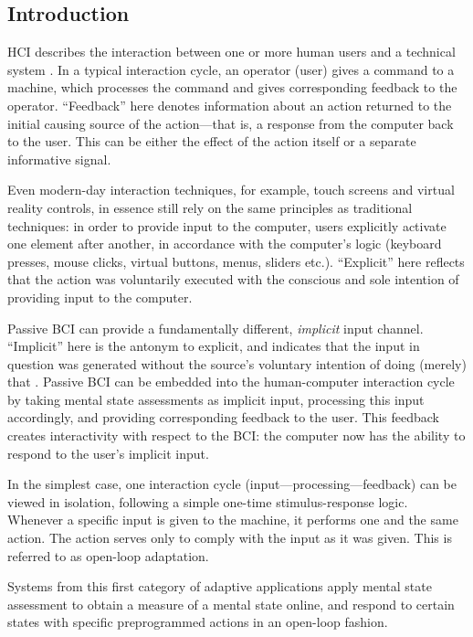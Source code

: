 \subsection{Introduction}

HCI describes the interaction between one or more human users and a technical system \cite{preece2015id}. In a typical interaction cycle, an operator (user) gives a command to a machine, which processes the command and gives corresponding feedback to the operator. ``Feedback'' here denotes information about an action returned to the initial causing source of the action---that is, a response from the computer back to the user. This can be either the effect of the action itself or a separate informative signal. 

Even modern-day interaction techniques, for example, touch screens and virtual reality controls, in essence still rely on the same principles as traditional techniques: in order to provide input to the computer, users explicitly activate one element after another, in accordance with the computer's logic (keyboard presses, mouse clicks, virtual buttons, menus, sliders etc.). ``Explicit'' here reflects that the action was voluntarily executed with the conscious and sole intention of providing input to the computer. 

Passive BCI can provide a fundamentally different, \emph{implicit} input channel. ``Implicit'' here is the antonym to explicit, and indicates that the input in question was generated without the source's voluntary intention of doing (merely) that \cite{schmidt2000,rotting2009implicit,zander2016nat}. Passive BCI can be embedded into the human-computer interaction cycle by taking mental state assessments as implicit input, processing this input accordingly, and providing corresponding feedback to the user. This feedback creates interactivity with respect to the BCI: the computer now has the ability to respond to the user's implicit input. 

In the simplest case, one interaction cycle (input---processing---feedback) can be viewed in isolation, following a simple one-time stimulus-response logic. Whenever a specific input is given to the machine, it performs one and the same action. The action serves only to comply with the input as it was given. This is referred to as open-loop adaptation.

Systems from this first category of adaptive applications apply mental state assessment to obtain a measure of a mental state online, and respond to certain states with specific preprogrammed actions in an open-loop fashion.

